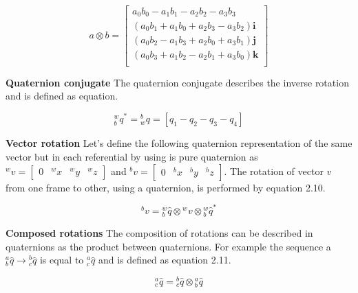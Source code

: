 \begin{equation}
    a \otimes b =
    \begin{bmatrix}
        a_0 b_0 - a_1 b_1 - a_2 b_2 - a_3 b_3                 \\
        (a_0 b_1 + a_1 b_0 + a_2 b_3 - a_3 b_2)\boldsymbol{i} \\
        (a_0 b_2 - a_1 b_3 + a_2 b_0 + a_3 b_1)\boldsymbol{j} \\
        (a_0 b_3 + a_1 b_2 - a_2 b_1 + a_3 b_0)\boldsymbol{k} \\
    \end{bmatrix}
\end{equation}

\item \textbf{Quaternion conjugate} The quaternion conjugate describes the inverse rotation and is defined as equation.

\begin{equation}
    \textrm{$_{b}^{w}q$}^* =\textrm{$_{w}^{b}q$} = \left[q_1 - q_2 - q_3 - q_4\right]
\end{equation}

\item \textbf{Vector rotation} Let’s define the following quaternion representation of the same vector but in each referential by using is pure quaternion as
$ ^wv = \begin{bmatrix}
        0 & ^wx & ^wy & ^wz
    \end{bmatrix} $
and
$^bv = \begin{bmatrix}
        0 & ^bx & ^by & ^bz
    \end{bmatrix} $. The rotation of vector $v$ from one frame to other, using a quaternion, is performed by equation 2.10.

\begin{equation}
    \textrm{$^{b}v$} = \textrm{$_{b}^{w}\hat{q}$} \otimes \textrm{$^{w}v$} \otimes \textrm{$_{b}^{w}\hat{q}$}^*
\end{equation}

\item \textbf{Composed rotations} The composition of rotations can be described in quaternions as the product between quaternions. For example the sequence a $^a_b\hat{q} \rightarrow {^b_c\hat{q}}$ is equal to $^a_c{\hat{q}}$ and is defined as equation 2.11.


\begin{equation}
    \textrm{$_{c}^{a}\hat{q}$} = \textrm{$_{c}^{b}\hat{q}$} \otimes \textrm{$_{b}^{a}\hat{q}$}
\end{equation}

